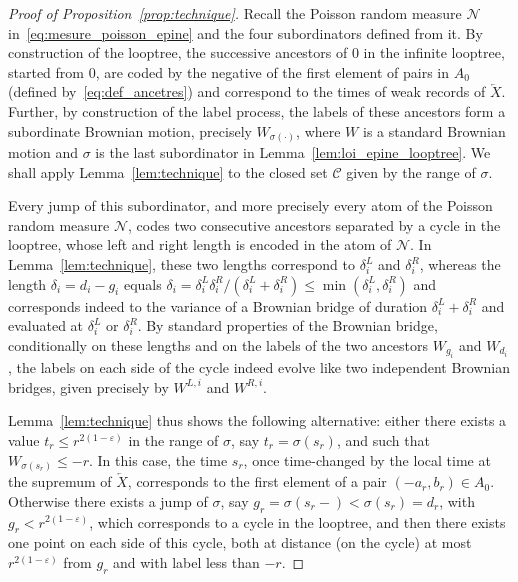 \documentclass[british, a4paper,11pt]{article}
\numberwithin{equation}{section}
\theoremstyle{definition}
\begin{document}
\begin{proof}[Proof of Proposition~\ref{prop:technique}]
Recall the Poisson random measure $\mathscr{N}$ in~\eqref{eq:mesure_poisson_epine} and the four subordinators defined from it.
By construction of the looptree, the successive ancestors of $0$ in the infinite looptree, started from $0$, are coded by the negative of the first element of pairs in $A_0$ (defined by~\eqref{eq:def_ancetres}) and correspond to the times of weak records of $\overleftarrow{X}$.
Further, by construction of the label process, the labels of these ancestors form a subordinate Brownian motion, precisely $W_{\sigma(\cdot)}$, where $W$ is a standard Brownian motion and $\sigma$ is the last subordinator in Lemma~\ref{lem:loi_epine_looptree}. 
We shall apply Lemma~\ref{lem:technique} to the closed set $\mathcal{C}$ given by the range of $\sigma$.

Every jump of this subordinator, and more precisely every atom of the Poisson random measure $\mathscr{N}$, codes two consecutive ancestors separated by a cycle in the looptree, whose left and right length is encoded in the atom of $\mathscr{N}$. In Lemma~\ref{lem:technique}, these two lengths correspond to $\delta^L_i$ and $\delta^R_i$, whereas the length $\delta_i = d_i-g_i$ equals $\delta_i = \delta^L_i \delta^R_i / (\delta^L_i+\delta^R_i) \leq \min(\delta^L_i, \delta^R_i)$ and corresponds indeed to the variance of a Brownian bridge of duration $\delta^L_i+\delta^R_i$ and evaluated at $\delta^L_i$ or $\delta^R_i$.
By standard properties of the Brownian bridge, conditionally on these lengths and on the labels of the two ancestors $W_{g_i}$ and $W_{d_i}$, the labels on each side of the cycle indeed evolve like two independent Brownian bridges, given precisely by $W^{L,i}$ and $W^{R,i}$.

Lemma~\ref{lem:technique} thus shows the following alternative: either there exists a value $t_r \leq r^{2(1-\varepsilon)}$ in the range of $\sigma$, say $t_r = \sigma(s_r)$, and such that $W_{\sigma(s_r)} \leq -r$.
In this case, the time $s_r$, once time-changed by the local time at the supremum of $\overleftarrow{X}$, corresponds to the first element of a pair $(-a_r, b_r) \in A_0$.
Otherwise there exists a jump of $\sigma$, say $g_r = \sigma(s_r-) < \sigma(s_r) = d_r$, with $g_r < r^{2(1-\varepsilon)}$, which corresponds to a cycle in the looptree, and then there exists one point on each side of this cycle, both at distance (on the cycle) at most $r^{2(1-\varepsilon)}$ from $g_r$ and with label less than $-r$.


\end{proof}
\end{document}
